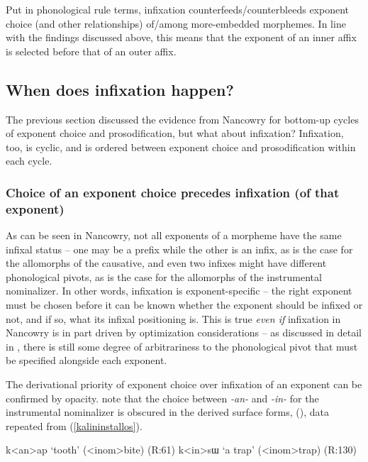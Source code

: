 \documentclass[output=paper]{langscibook}
\newcounter{nexttmp}    %
\newcommand{\Next}{\setcounter{nexttmp}{\value{equation}}\stepcounter{nexttmp}(\thenexttmp)\xspace}
\begin{document}
Put in phonological rule terms, infixation counterfeeds/counterbleeds exponent choice (and other relationships) of/among more-embedded morphemes. In line with the findings discussed above, this means that the exponent of an inner affix is selected before that of an outer affix.

\subsection{When does infixation happen?}\label{sec:kalin:4.2}

The previous section discussed the evidence from Nancowry for bottom-up cycles of exponent choice and prosodification, but what about infixation? Infixation, too, is cyclic, and is ordered between exponent choice and prosodification within each cycle.

\subsubsection{Choice of an exponent choice precedes infixation (of that exponent)}\label{sec:kalin:4.2.1}

As can be seen in Nancowry, not all exponents of a morpheme have the same infixal status -- one may be a prefix while the other is an infix, as is the case for the allomorphs of the causative, and even two infixes might have different phonological pivots, as is the case for the allomorphs of the instrumental nominalizer. In other words, infixation is exponent-specific -- the right exponent must be chosen before it can be known whether the exponent should be infixed or not, and if so, what its infixal positioning is. This is true {\it even if} infixation in Nancowry is in part driven by optimization considerations -- as discussed in detail in , there is still some degree of  arbitrariness to the phonological pivot that must be specified alongside each exponent.

The derivational priority of exponent choice over infixation of an exponent can be confirmed by opacity. \citet{KalinRolle21} note that the choice between \textit{-an-} and \textit{-in-} for the instrumental nominalizer is obscured in the derived surface forms, \Next, data repeated from (\ref{kalininstallos}).

\ea 
\ea k<an>ap `tooth' (<{\sc inom}>bite) \hfill (R:61)\label{kalin18a}
\ex  k<in>sɯ `a trap' (<{\sc inom}>trap) \hfill (R:130)\label{kalin18b}
\z
\z
\end{document}
